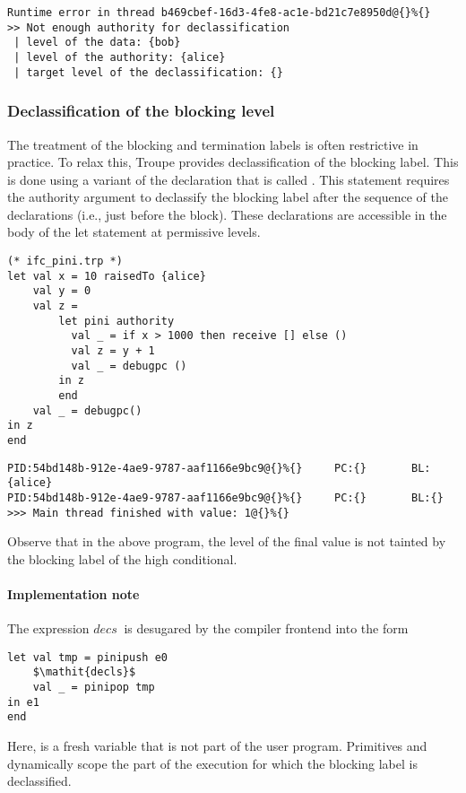 \begin{lstlisting}
Runtime error in thread b469cbef-16d3-4fe8-ac1e-bd21c7e8950d@{}%{}
>> Not enough authority for declassification
 | level of the data: {bob}
 | level of the authority: {alice}
 | target level of the declassification: {}    
\end{lstlisting}

\subsubsection{Declassification of the blocking level}
\label{sec:pinidecl}
The treatment of the blocking and termination labels is often restrictive in practice. To relax this, 
Troupe provides declassification of the blocking label. This is done using 
a variant of the  declaration that is called . 
This statement requires the authority argument to declassify the blocking label 
after the sequence of the declarations (i.e., just before the  block).
These declarations are accessible in the body of the let statement at permissive
levels.

\begin{lstlisting}
(* ifc_pini.trp *)
let val x = 10 raisedTo {alice}
    val y = 0
    val z = 
        let pini authority
          val _ = if x > 1000 then receive [] else ()
          val z = y + 1
          val _ = debugpc () 
        in z
        end
    val _ = debugpc()
in z
end
\end{lstlisting}

\begin{verbatim}
PID:54bd148b-912e-4ae9-9787-aaf1166e9bc9@{}%{}     PC:{}       BL:{alice}           
PID:54bd148b-912e-4ae9-9787-aaf1166e9bc9@{}%{}     PC:{}       BL:{}            
>>> Main thread finished with value: 1@{}%{}
\end{verbatim}
Observe that in the above program, the level of the final value 
is not tainted by the blocking label of the high conditional. 


\paragraph{Implementation note}
The expression  $\mathit{decs}\ $ is desugared by the compiler frontend into the form 
\begin{lstlisting}
let val tmp = pinipush e0 
    $\mathit{decls}$
    val _ = pinipop tmp
in e1      
end
\end{lstlisting}
Here,  is a fresh variable that is not part of the user program. Primitives  and 
 dynamically scope the part of the execution for which the blocking label is declassified.


